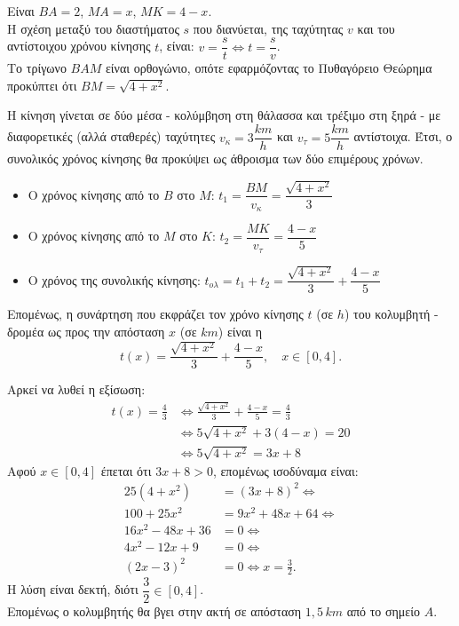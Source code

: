 \begin{alist}
\item Είναι $BA = 2$, $MA = x$, $MK = 4-x$. \\
Η σχέση μεταξύ του διαστήματος $s$ που διανύεται, της ταχύτητας $v$ και του αντίστοιχου χρόνου κίνησης $t$, είναι: $v = \dfrac{s}{t} \Leftrightarrow t = \dfrac{s}{v}$. \\
Το τρίγωνο $BAM$ είναι ορθογώνιο, οπότε εφαρμόζοντας το Πυθαγόρειο Θεώρημα προκύπτει ότι $BM = \sqrt{4 + x^2}$.
\item Η κίνηση γίνεται σε δύο μέσα - κολύμβηση στη θάλασσα και τρέξιμο στη ξηρά - με διαφορετικές (αλλά σταθερές) ταχύτητες $v_{\kappa} = 3 \dfrac{km}{h}$ και $v_{\tau} = 5 \dfrac{km}{h}$ αντίστοιχα. Έτσι, ο συνολικός χρόνος κίνησης θα προκύψει ως άθροισμα των δύο επιμέρους χρόνων.
\begin{itemize}
    \item Ο χρόνος κίνησης από το $B$ στο $M$: $t_1 = \dfrac{BM}{v_{\kappa}} = \dfrac{\sqrt{4+x^2}}{3}$
    \item Ο χρόνος κίνησης από το $M$ στο $K$: $t_2 = \dfrac{MK}{v_{\tau}} = \dfrac{4-x}{5}$
    \item Ο χρόνος της συνολικής κίνησης: $t_{o\lambda} = t_1 + t_2 = \dfrac{\sqrt{4+x^2}}{3} + \dfrac{4-x}{5}$
\end{itemize}
Επομένως, η συνάρτηση που εκφράζει τον χρόνο κίνησης $t$ (σε $h$) του κολυμβητή - δρομέα ως προς την απόσταση $x$ (σε $km$) είναι η
\[t(x) = \frac{\sqrt{4+x^2}}{3} + \frac{4-x}{5}, \quad x \in [0, 4].\]
\item Αρκεί να λυθεί η εξίσωση:
\begin{align*}
t(x) = \frac{4}{3} &\Leftrightarrow \frac{\sqrt{4+x^2}}{3} + \frac{4-x}{5} = \frac{4}{3} \\
&\Leftrightarrow 5\sqrt{4+x^2} + 3(4-x) = 20 \\
&\Leftrightarrow 5\sqrt{4+x^2} = 3x + 8
\end{align*}
Αφού $x \in [0,4]$ έπεται ότι $3x + 8 > 0$, επομένως ισοδύναμα είναι:
\begin{align*}
25(4+x^2) &= (3x+8)^2 \Leftrightarrow \\
100 + 25x^2 &= 9x^2 + 48x + 64 \Leftrightarrow \\
16x^2 - 48x + 36 &= 0 \Leftrightarrow \\
4x^2 - 12x + 9 &= 0 \Leftrightarrow \\
(2x - 3)^2 &= 0 \Leftrightarrow x = \frac{3}{2}.
\end{align*}
Η λύση είναι δεκτή, διότι $\dfrac{3}{2} \in [0,4]$. \\
Επομένως ο κολυμβητής θα βγει στην ακτή σε απόσταση $1,5 \, km$ από το σημείο $A$.
\end{alist}

